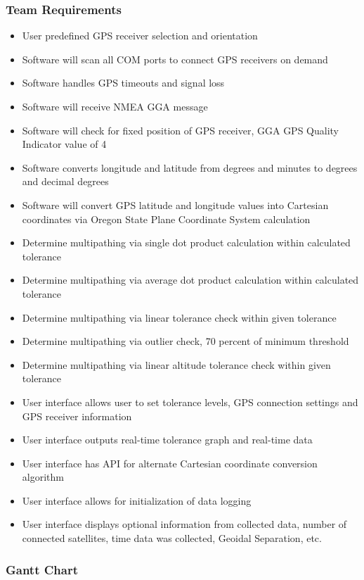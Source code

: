 \documentclass[12pt]{article}
\begin{document}
\subsubsection{Team Requirements}
\begin{itemize}
\item User predefined GPS receiver selection and orientation 
\item Software will scan all COM ports to connect GPS receivers on demand 
\item Software handles GPS timeouts and signal loss 
\item Software will receive NMEA GGA message 
\item Software will check for fixed position of GPS receiver, GGA GPS Quality Indicator value of 4 
\item Software converts longitude and latitude from degrees and minutes to degrees and decimal degrees 
\item Software will convert GPS latitude and longitude values into Cartesian coordinates via Oregon State Plane Coordinate System calculation 
\item Determine multipathing via single dot product calculation within calculated tolerance  
\item Determine multipathing via average dot product calculation within calculated tolerance 
\item Determine multipathing via linear tolerance check within given tolerance 
\item Determine multipathing via outlier check, 70 percent of minimum threshold 
\item Determine multipathing via linear altitude tolerance check within given tolerance 
\item User interface allows user to set tolerance levels, GPS connection settings and GPS receiver information 
\item User interface outputs real-time tolerance graph and real-time data 
\item User interface has API for alternate Cartesian coordinate conversion algorithm 
\item User interface allows for initialization of data logging 
\item User interface displays optional information from collected data, number of connected satellites, time data was collected, Geoidal Separation, etc. 
\end{itemize}
\subsubsection{Gantt Chart}
\end{document}
